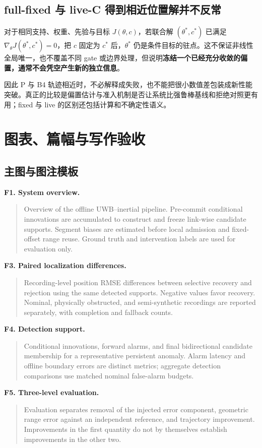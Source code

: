 \documentclass[UTF8,fontset=fandol,11pt,a4paper]{ctexart}
\newcommand{\eng}[1]{\begin{quote}\small #1\end{quote}}
\begin{document}
\subsection{full-fixed 与 live-C 得到相近位置解并不反常}
对于相同支持、权重、先验与目标 \(J(\theta,c)\)，若联合解 \((\theta^*,c^*)\) 已满足
\(\nabla_\theta J(\theta^*,c^*)=0\)，把 \(c\) 固定为 \(c^*\) 后，\(\theta^*\) 仍是条件目标的驻点。这不保证非线性全局唯一，也不覆盖不同 gate 或边界处理，但说明\textbf{冻结一个已经充分收敛的偏置，通常不会凭空产生新的独立信息}。

因此 P 与 B4 轨迹相近时，不必解释成失败，也不能把很小数值差包装成新性能突破。真正的比较是偏置估计与准入机制是否让系统比强鲁棒基线和拒绝对照更有用；fixed 与 live 的区别还包括计算和不确定性语义。

\section{图表、篇幅与写作验收}

\subsection{主图与图注模板}
\textbf{F1. System overview.}
\eng{Overview of the offline UWB--inertial pipeline. Pre-commit conditional innovations are accumulated to construct and freeze link-wise candidate supports. Segment biases are estimated before local admission and fixed-offset range reuse. Ground truth and intervention labels are used for evaluation only.}

\textbf{F3. Paired localization differences.}
\eng{Recording-level position RMSE differences between selective recovery and rejection using the same detected supports. Negative values favor recovery. Nominal, physically obstructed, and semi-synthetic recordings are reported separately, with completion and fallback counts.}

\textbf{F4. Detection support.}
\eng{Conditional innovations, forward alarms, and final bidirectional candidate membership for a representative persistent anomaly. Alarm latency and offline boundary errors are distinct metrics; aggregate detection comparisons use matched nominal false-alarm budgets.}

\textbf{F5. Three-level evaluation.}
\eng{Evaluation separates removal of the injected error component, geometric range error against an independent reference, and trajectory improvement. Improvements in the first quantity do not by themselves establish improvements in the other two.}
\end{document}
